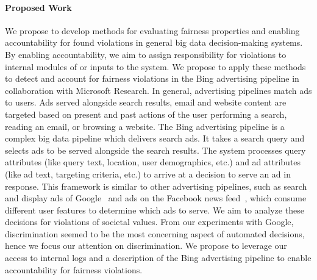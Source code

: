\documentclass[10pt, onecolumn]{report}
\begin{document}
\paragraph{Proposed Work}
We propose to develop methods for evaluating fairness properties and enabling 
accountability for found violations in general big data decision-making systems. 
By enabling accountability, we aim to assign responsibility for
violations to internal modules of or inputs to the system. 
We propose to apply these methods to detect and account for
fairness violations in the Bing advertising pipeline in collaboration with Microsoft Research.
In general, advertising pipelines match ads to users. 
Ads served alongside search results, email and website content are targeted based on
present and past actions of the user performing a search, reading an email, or browsing
a website. The Bing advertising pipeline is a complex big data pipeline 
which delivers search ads. It takes a search query
and selects ads to be served alongside the search results. The system processes
query attributes (like query text, location, user demographics, etc.) and 
ad attributes (like ad text, targeting criteria, etc.) to arrive at a decision to 
serve an ad in response. 
This framework is similar to other advertising pipelines, such as search and 
display ads of Google~\cite{google-search, google-display} 
and ads on the Facebook news feed~\cite{facebook-ads}, which consume different
user features to determine which ads to serve. 
We aim to analyze these decisions for violations of societal values. 
From our experiments with Google, discrimination 
seemed to be the most concerning aspect of automated decisions, 
hence we focus our attention on discrimination. 
We propose to leverage our access to internal logs and a description of the Bing
advertising pipeline to enable accountability for fairness violations. 
\end{document}
